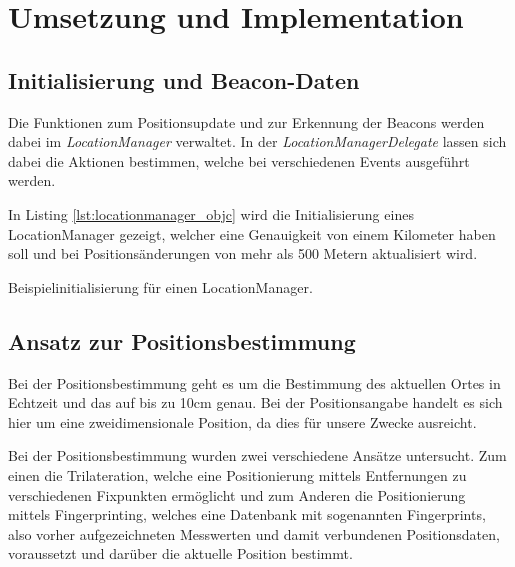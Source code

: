\chapter{Umsetzung und Implementation}
\label{chap:implementation}


\section{Initialisierung und Beacon-Daten}
\label{sec:implementation:initandbeacon}
Die Funktionen zum Positionsupdate und zur Erkennung der Beacons werden dabei im \emph{LocationManager} verwaltet.
In der \emph{LocationManagerDelegate} lassen sich dabei die Aktionen bestimmen, welche bei verschiedenen Events ausgeführt werden.

In Listing \ref{lst:locationmanager_objc} wird die Initialisierung eines LocationManager gezeigt, welcher eine Genauigkeit von einem Kilometer haben soll und bei Positionsänderungen von mehr als 500 Metern aktualisiert wird.

  \begin{listing}[htb!]
    \caption{Beispielinitialisierung für einen LocationManager.}
    \label{lst:locationmanager_objc}
  \end{listing}

\section{Ansatz zur Positionsbestimmung}
\label{sec:implementation:positioning}
Bei der Positionsbestimmung geht es um die Bestimmung des aktuellen Ortes in Echtzeit und das auf bis zu 10cm genau. Bei der Positionsangabe handelt es sich hier um eine zweidimensionale Position, da dies für unsere Zwecke ausreicht.

Bei der Positionsbestimmung wurden zwei verschiedene Ansätze untersucht. Zum einen die Trilateration, welche eine Positionierung mittels Entfernungen zu verschiedenen Fixpunkten ermöglicht und zum Anderen die Positionierung mittels Fingerprinting, welches eine Datenbank mit sogenannten Fingerprints, also vorher aufgezeichneten Messwerten und damit verbundenen Positionsdaten, voraussetzt und darüber die aktuelle Position bestimmt.

